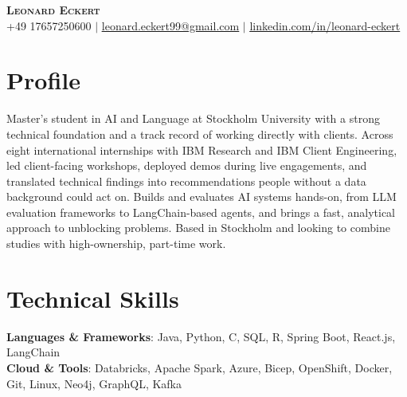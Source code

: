 \documentclass[letterpaper,11pt]{article}
\begin{document}
\begin{center}
    \textbf{\Huge \scshape Leonard Eckert} \\ \vspace{1pt}
    \small +49 17657250600 $|$ \href{mailto:leonard.eckert99@gmail.com}{\underline{leonard.eckert99@gmail.com}} $|$
    \href{https://linkedin.com/in/leonard-eckert/}{\underline{linkedin.com/in/leonard-eckert}}
\end{center}


\section{Profile}
    \small{Master's student in AI and Language at Stockholm University with a strong technical foundation and a track record of working directly with clients. Across eight international internships with IBM Research and IBM Client Engineering, led client-facing workshops, deployed demos during live engagements, and translated technical findings into recommendations people without a data background could act on. Builds and evaluates AI systems hands-on, from LLM evaluation frameworks to LangChain-based agents, and brings a fast, analytical approach to unblocking problems. Based in Stockholm and looking to combine studies with high-ownership, part-time work.}


\section{Technical Skills}
 \begin{itemize}[leftmargin=0.15in, label={}]
    \small{\item{
     \textbf{Languages \& Frameworks}{: Java, Python, C, SQL, R, Spring Boot, React.js, LangChain} \\
     \textbf{Cloud \& Tools}{: Databricks, Apache Spark, Azure, Bicep, OpenShift, Docker, Git, Linux, Neo4j, GraphQL, Kafka}
    }}
 \end{itemize}


\end{document}
